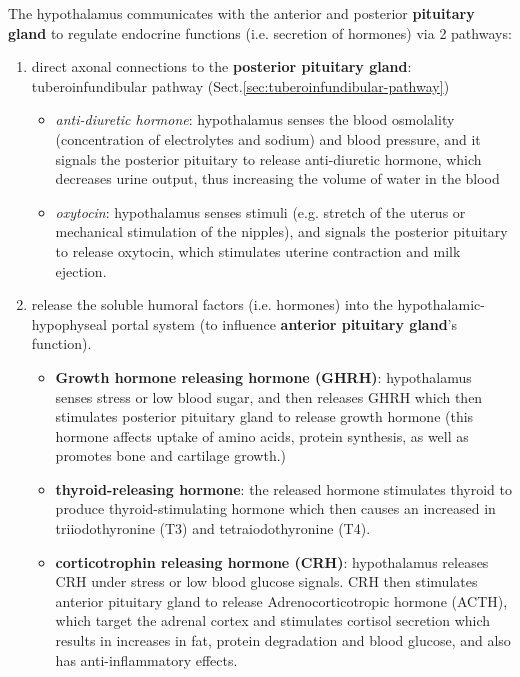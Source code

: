 The hypothalamus communicates with the anterior and posterior {\bf pituitary
gland} to regulate endocrine functions (i.e. secretion of hormones) via 2
pathways:
\begin{enumerate}
  \item direct axonal connections to the {\bf posterior pituitary gland}:
  tuberoinfundibular pathway (Sect.\ref{sec:tuberoinfundibular-pathway}) 
  \begin{itemize}
    
    \item {\it anti-diuretic hormone}:  hypothalamus senses the blood osmolality
    (concentration of electrolytes and sodium) and blood pressure, and
    it signals the posterior pituitary to release anti-diuretic hormone, which
    decreases urine output, thus increasing the volume of water in the blood

    \item {\it oxytocin}:  hypothalamus senses stimuli (e.g. stretch of the
    uterus or mechanical stimulation of the nipples), and signals the posterior
    pituitary to release oxytocin, which stimulates uterine contraction and milk
    ejection.
  \end{itemize}
  
  \item release the soluble humoral factors (i.e. hormones) into the
  hypothalamic-hypophyseal portal system (to influence {\bf anterior pituitary
  gland}'s function).
  \begin{itemize}
    
    \item {\bf Growth hormone releasing hormone (GHRH)}: hypothalamus senses
    stress or low blood sugar, and then releases GHRH which then stimulates
    posterior pituitary gland to release growth hormone (this hormone affects
    uptake of amino acids, protein synthesis, as well as promotes bone and cartilage growth.)
    
    \item {\bf thyroid-releasing hormone}: the released hormone stimulates
    thyroid to produce thyroid-stimulating hormone which then causes an
    increased in triiodothyronine (T3) and tetraiodothyronine (T4).
    
    \item {\bf corticotrophin releasing hormone (CRH)}: hypothalamus releases
    CRH under stress or low blood glucose signals. CRH then stimulates anterior
    pituitary gland to release Adrenocorticotropic hormone (ACTH), which target
    the adrenal cortex and stimulates cortisol secretion which results in
    increases in fat, protein degradation and blood glucose, and 
    also has anti-inflammatory effects.
    

\end{itemize}
\end{enumerate}
